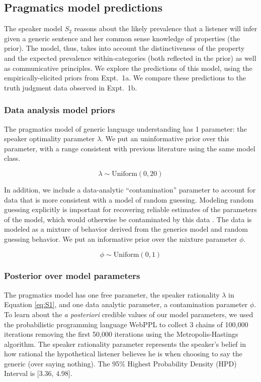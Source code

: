 \documentclass[10pt,letterpaper]{article}
\begin{document}
\subsection{Pragmatics model predictions}

The speaker model $S_2$ reasons about the likely prevalence that a listener will infer given a generic sentence and her common sense knowledge of properties (the prior). 
The model, thus, takes into account the distinctiveness of the property and the expected prevalence within-categories (both reflected in the prior) as well as communicative principles.
We explore the predictions of this model, using the empirically-elicited priors from Expt.~1a. 
We compare these predictions to the truth judgment data observed in Expt.~1b.

\subsubsection{Data analysis model priors}

The pragmatics model of generic language understanding has 1 parameter: the speaker optimality parameter $\lambda$. 
We put an uninformative prior over this parameter, with a range consistent with previous literature using the same model class.

$$
\lambda \sim \text{Uniform}(0,20)
$$

In addition, we include a data-analytic ``contamination'' parameter to account for data that is more consistent with a model of random guessing. 
Modeling random guessing explicitly is important for recovering reliable estimates of the parameters of the model, which would otherwise be contaminated by this data \cite{LW2014}.
The data is modeled as a mixture of behavior derived from the generics model and random guessing behavior. 
We put an informative prior over the mixture parameter $\phi$.

$$
\phi \sim \text{Uniform}(0,1)
$$


\subsubsection{Posterior over model parameters}

The pragmatics model has one free parameter, the speaker rationality $\lambda$ in Equation \ref{eq:S1}, and one data analytic parameter, a contamination parameter $\phi$.
To learn about the \emph{a posteriori} credible values of our model parameters, we used the probabilistic programming language WebPPL \cite{dippl} to collect 3 chains of 100,000 iterations removing the first 50,000 iterations using the Metropolis-Hastings algorithm. 
The speaker rationality parameter represents the speaker's belief in how rational the hypothetical listener believes he is when choosing to say the generic (over saying nothing). 
The 95\% Highest Probability Density (HPD) Interval is [3.36, 4.98].
\end{document}
